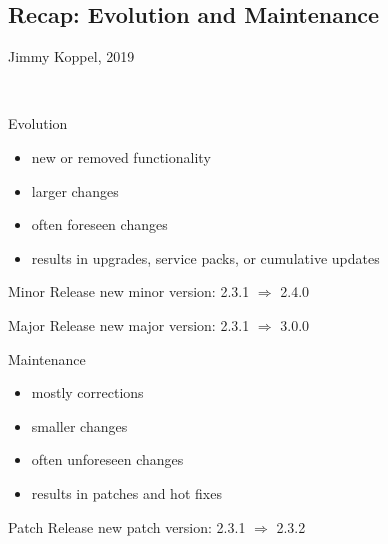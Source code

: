 \subsection{Recap: Evolution and Maintenance}
\begin{frame}{\insertsubsection}
	\begin{mycolumns}[columns=3,widths={25,50},animation=none]
	\mynextcolumn
		\begin{note}{Jimmy Koppel, 2019}
		\end{note}
	\mynextcolumn
	\end{mycolumns}
\end{frame}

\begin{frame}{\insertsubsection\ \mytitlesource{\ludewiglichter}}
	\begin{mycolumns}[t]
		\begin{note}{Evolution}
			\begin{itemize}
				\item new or removed functionality
				\item larger changes
				\item often foreseen changes
				\item results in upgrades, service packs, or cumulative updates
			\end{itemize}
		\end{note}
		\begin{example}{Minor Release}
			new minor version: 2.3.1 $\Rightarrow$ 2.4.0
		\end{example}
		\begin{example}{Major Release}
			new major version: 2.3.1 $\Rightarrow$ 3.0.0
		\end{example}
	\mynextcolumn
		\begin{note}{Maintenance}
			\begin{itemize}
				\item mostly corrections
				\item smaller changes
				\item often unforeseen changes
				\item results in patches and hot fixes
			\end{itemize}
		\end{note}
		\begin{example}{Patch Release}
			new patch version: 2.3.1 $\Rightarrow$ 2.3.2
		\end{example}
	\end{mycolumns}
\end{frame}

